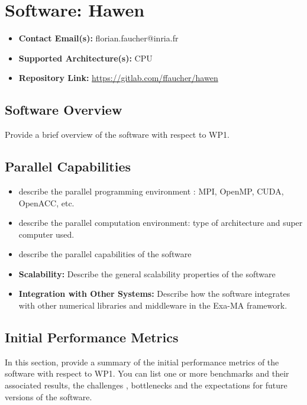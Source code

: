 \section{Software: Hawen}
\label{sec:WP1:Hawen:software}

\begin{itemize}
    \item \textbf{Contact Email(s):} florian.faucher@inria.fr
    \item \textbf{Supported Architecture(s):} CPU
    \item \textbf{Repository Link:} \href{https://gitlab.com/ffaucher/hawen}{https://gitlab.com/ffaucher/hawen}
\end{itemize}

\subsection{Software Overview}
\label{sec:WP1:Hawen:summary}

Provide a brief overview of the software with respect to WP1.

\subsection{Parallel Capabilities}
\label{sec:WP1:Hawen:performances}


\begin{itemize}
    \item describe the parallel programming  environment : MPI, OpenMP, CUDA, OpenACC, etc.
    \item describe the parallel computation environment: type of architecture and super computer used.
    \item describe the parallel capabilities of the software
    \item \textbf{Scalability:} Describe the general scalability properties of the software
    \item \textbf{Integration with Other Systems:} Describe how the software integrates with other numerical libraries and middleware in the Exa-MA framework.
\end{itemize}

\subsection{Initial Performance Metrics}
\label{sec:WP1:Hawen:metrics}

In this section, provide a summary of the initial performance metrics of the software with respect to WP1.
You can list one or more benchmarks and their associated results, the challenges , bottlenecks and the expectations for future versions of the software.



